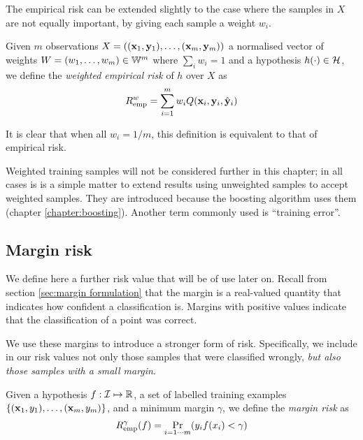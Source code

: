 The empirical risk can be extended slightly to the case where
the samples in $X$ are not equally important, by giving each sample a
weight $w_i$.

\begin{definition}
Given $m$ observations $X = ((\mathbf{x}_1, \mathbf{y}_1), \ldots, (\mathbf{x}_m,
\mathbf{y}_m))$ a normalised vector of weights $W = (w_1, \ldots, w_m) \in
\mathbb{W}^m$ where $\sum_{i} w_i = 1$ and a hypothesis $h(\cdot) \in
\mathcal{H}$, we define the \emph{weighted empirical risk} of $h$ over $X$ as 
%
\begin{equation}
R_{\mathrm{emp}}^w = \sum_{i=1}^{m} w_i Q(\mathbf{x}_i, \mathbf{y}_i, \hat{\mathbf{y}}_i)
\end{equation}
\end{definition}

It is clear that when all $w_i = 1/m$, this definition is equivalent
to that of empirical risk.

Weighted training samples will not be considered further in this
chapter; in all cases is is a simple matter to extend results using
unweighted samples to accept weighted samples.  They are introduced
because the boosting algorithm uses them (chapter
\ref{chapter:boosting}).  Another term commonly used is ``training error''.


\subsection{Margin risk}
\label{sec:margin risk}

We define here a further risk value that will be of use later on.
Recall from section \ref{sec:margin formulation} that the margin is a
real-valued quantity that indicates how confident a classification
is.  Margins with positive values indicate that the classification of
a point was correct.

We use these margins to introduce a stronger form of risk.
Specifically, we include in our risk values not only those samples
that were classified wrongly, \emph{but also those samples with a
small margin}. 

\begin{definition}
Given a hypothesis $f : \mathcal{I} \mapsto \mathbb{R}$, a set of
labelled training examples $\{(\mathbf{x}_1, y_1), \ldots, (\mathbf{x}_m, y_m)\}$,
and a minimum margin $\gamma$, we define the \emph{margin risk} as
%
\begin{equation}
R^{\gamma}_{\mathrm{emp}}(f) = \Pr_{i=1\cdots m}(y_i f(x_i) < \gamma)
\end{equation}
\end{definition}

